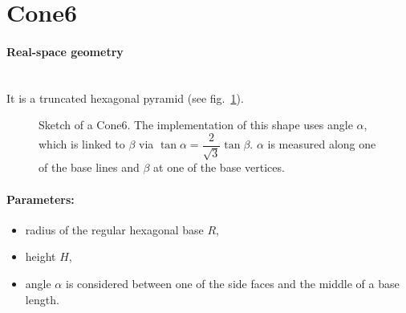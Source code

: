 \newpage
\section{Cone6} 

\paragraph{Real-space geometry}\mbox{}\\
It is a truncated hexagonal pyramid (see fig.~\ref{fig:cone6}). 

\begin{figure}[ht]
\hfill
{}
\hfill
{}
\hfill
\caption{Sketch of a Cone6.  The implementation of this shape uses angle
  $\alpha$, which is linked to $\beta$ via $\tan \alpha = \dfrac{2}{\sqrt{3}} \tan 
  \beta$. $\alpha$ is measured along one of the base lines and $\beta$
  at one of the base vertices.}
\label{fig:cone6}
\end{figure}

\FloatBarrier

\paragraph{Parameters:}
\begin{itemize}
\item radius of the regular hexagonal base $R$,
\item height $H$,
\item angle $\alpha$ is considered between one of the side faces and
  the middle of a base length. 
\end{itemize}

